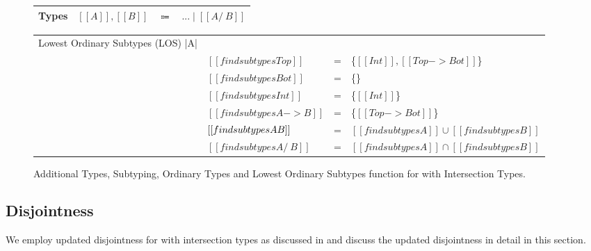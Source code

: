 \begin{figure}[t]
  \begin{small}
    \centering
    \begin{tabular}{lrcl} \toprule
      Types & $[[A]], [[B]]$ & $\Coloneqq$ & $ ... \mid [[A /\ B]] $ \\
      \bottomrule
    \end{tabular}
  \end{small}
  \medskip
    \begin{small}
    \centering
  \end{small}
  \medskip
    \begin{small}
    \centering
  \end{small}
  \medskip
    \centering
    \begin{tabular}{llcl}
      \toprule
      Lowest Ordinary Subtypes (LOS) |A| &  & & \\
     & $[[findsubtypes Top]]$ & = & \{$ [[Int]], [[Top -> Bot]]$\}  \\
     & $[[findsubtypes Bot]]$ & = & \{\}  \\
     & $[[findsubtypes Int]]$ & = & \{$ [[Int]] $\}  \\
     & $[[findsubtypes A -> B]]$ & = & \{$ [[Top -> Bot]] $\}  \\
     & $[[findsubtypes A \/ B]]$ & = & $ [[findsubtypes A]] \cup [[findsubtypes B]] $\\
     & $[[findsubtypes A /\ B]]$ & = & $ [[findsubtypes A]] \cap [[findsubtypes B]] $\\
      \bottomrule
    \end{tabular}
  \caption{Additional Types, Subtyping, Ordinary Types and Lowest Ordinary Subtypes function for \cal with Intersection Types.}
  \label{fig:inter:system}
\end{figure}

\subsection{Disjointness}
\label{sec:inter:disj}
We employ updated disjointness for \cal with intersection types as discussed in 
and discuss the updated disjointness in detail in this section.

